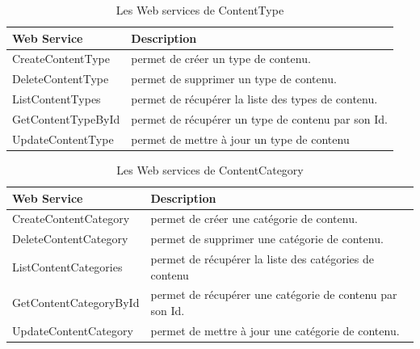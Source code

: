 \begin{table}[H]
    \centering
    \begin{tabular}{|m{5cm}|m{10cm}|}
        \hline
        \textbf{Web Service} & \textbf{Description}                               \\
        \hline
        CreateContentType    & permet de créer un type de contenu.                \\
        \hline
        DeleteContentType    & permet de supprimer un type de contenu.            \\
        \hline
        ListContentTypes     & permet de récupérer la liste des types de contenu. \\
        \hline
        GetContentTypeById   & permet de récupérer un type de contenu par son Id. \\
        \hline

        UpdateContentType    & permet de mettre à jour un type de contenu         \\
        \hline
    \end{tabular}
    \caption{Les Web services de ContentType}
    \label{tab:my_label}
\end{table}






\begin{table}[H]
    \centering
    \begin{tabular}{|m{5cm}|m{10cm}|}
        \hline
        \textbf{Web Service}   & \textbf{Description}                                     \\
        \hline
        CreateContentCategory  & permet de créer une catégorie de contenu.                \\
        \hline
        DeleteContentCategory  & permet de supprimer une catégorie de contenu.            \\
        \hline
        ListContentCategories  & permet de récupérer la liste des catégories de contenu   \\
        \hline
        GetContentCategoryById & permet de récupérer une catégorie de contenu par son Id. \\
        \hline
        UpdateContentCategory  & permet de mettre à jour une catégorie de contenu.        \\
        \hline
    \end{tabular}
    \caption{Les Web services de ContentCategory}
    \label{tab:my_label}
\end{table}




